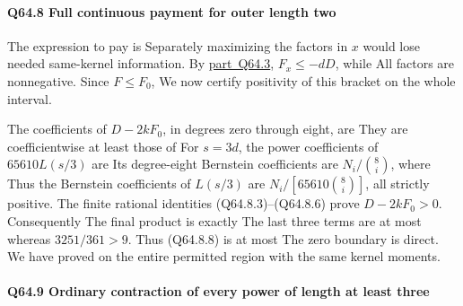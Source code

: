 \paragraph{Q64.8 Full continuous payment for outer length two}\label{part:Q64.8}

The expression to pay is
Separately maximizing the factors in \(x\) would lose needed
same-kernel information. By \mbox{\hyperref[part:Q64.3]{part Q64.3}}, \(F_x\le-dD\), while
All factors are nonnegative. Since \(F\le F_0\),
We now certify positivity of this bracket on the whole interval.

The coefficients of \(D-2kF_0\), in degrees zero through eight, are
They are coefficientwise at least those of
For \(s=3d\), the power coefficients of \(65610L(s/3)\) are
Its degree-eight Bernstein coefficients are \(N_i/\binom8i\), where
Thus the Bernstein coefficients of \(L(s/3)\) are
\(N_i/[65610\binom8i]\), all strictly positive. The finite rational
identities (Q64.8.3)--(Q64.8.6) prove \(D-2kF_0>0\). Consequently
The final product is exactly
The last three terms are at most
whereas \(3251/361>9\). Thus (Q64.8.8) is at most
The zero boundary is direct. We have proved
on the entire permitted region with the same kernel moments.

\paragraph{Q64.9 Ordinary contraction of every power of length at least three}\label{part:Q64.9}

